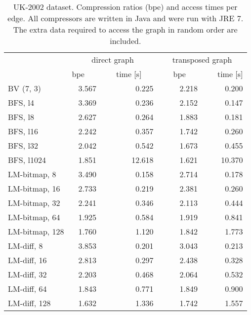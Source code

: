\documentclass[envcountsame]{llncs}
\begin{document}
\begin{table}
\centering
\begin{tabular}{lrrrr}
\hline
        & \multicolumn{2}{c}{direct graph} & \multicolumn{2}{c}{transposed graph} \\
\cline{2-5}
        &  bpe~~~&~~~time [s]~~~&~~~bpe~~~&~~~time [s] \\
\hline
BV (7, 3) & 3.567 & 0.225 & 2.218 & 0.200 \\
BFS, l4 & 3.369 & 0.236 & 2.152 & 0.147 \\
BFS, l8 & 2.627 & 0.264 & 1.883 & 0.181 \\
BFS, l16 & 2.242 & 0.357 & 1.742 & 0.260 \\
BFS, l32 & 2.042 & 0.542 & 1.673 & 0.455 \\
BFS, l1024 & 1.851 & 12.618 & 1.621 & 10.370 \\
LM-bitmap, 8 & 3.490 & 0.158 & 2.714 & 0.178 \\
LM-bitmap, 16 & 2.733 & 0.219 & 2.381 & 0.260 \\
LM-bitmap, 32 & 2.241 & 0.346 & 2.113 & 0.444 \\
LM-bitmap, 64 & 1.925 & 0.584 & 1.919 & 0.841 \\
LM-bitmap, 128 & 1.760 & 1.120 & 1.842 & 1.773 \\
LM-diff, 8 & 3.853 & 0.201 & 3.043 & 0.213 \\
LM-diff, 16 & 2.813 & 0.297 & 2.438 & 0.328 \\
LM-diff, 32 & 2.203 & 0.468 & 2.064 & 0.532 \\
LM-diff, 64 & 1.843 & 0.771 & 1.849 & 0.900 \\
LM-diff, 128 & 1.632 & 1.336 & 1.742 & 1.557 \\

\hline
\end{tabular}
\vspace{4mm}
\caption{UK-2002 dataset. Compression ratios (bpe) and access times per edge. 
All compressors are written in Java and were run with JRE 7.
The extra data required to access the graph in random order are included.
}
\label{table:app_uk}
\end{table}
\end{document}
